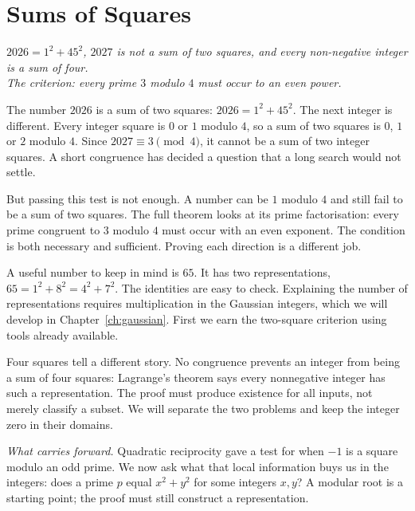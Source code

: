 \chapter{Sums of Squares}\label{ch:squares}

\begin{center}\itshape
$2026=1^2+45^2$, $2027$ is not a sum of two squares, and every non-negative integer is a sum of four.\\
The criterion: every prime $3$ modulo $4$ must occur to an even power.
\end{center}


The number $2026$ is a sum of two squares: $2026=1^2+45^2$. The next integer is different. Every integer square is $0$ or $1$ modulo $4$, so a sum of two squares is $0$, $1$ or $2$ modulo $4$. Since $2027\equiv3\pmod4$, it cannot be a sum of two integer squares. A short congruence has decided a question that a long search would not settle.

But passing this test is not enough. A number can be $1$ modulo $4$ and still fail to be a sum of two squares. The full theorem looks at its prime factorisation: every prime congruent to $3$ modulo $4$ must occur with an even exponent. The condition is both necessary and sufficient. Proving each direction is a different job.

A useful number to keep in mind is $65$. It has two representations, $65=1^2+8^2=4^2+7^2$. The identities are easy to check. Explaining the number of representations requires multiplication in the Gaussian integers, which we will develop in Chapter~\ref{ch:gaussian}. First we earn the two-square criterion using tools already available.

Four squares tell a different story. No congruence prevents an integer from being a sum of four squares: Lagrange's theorem says every nonnegative integer has such a representation. The proof must produce existence for all inputs, not merely classify a subset. We will separate the two problems and keep the integer zero in their domains.



\noindent\emph{What carries forward.} Quadratic reciprocity gave a test for when $-1$ is a square modulo an odd prime. We now ask what that local information buys us in the integers: does a prime $p$ equal $x^2+y^2$ for some integers $x,y$? A modular root is a starting point; the proof must still construct a representation.

